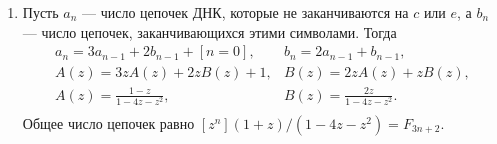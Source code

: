 \documentclass[14pt]{book}
\begin{document}
\begin{enumerate}
\item Пусть $a_n$ --- число цепочек ДНК, которые не заканчиваются на $c$ или $e$, а $b_n$ --- число
      цепочек, заканчивающихся этими символами. Тогда
      $$
      \begin{array}{ll}
      a_n = 3a_{n-1}+2b_{n-1}+[n=0], & b_n = 2a_{n-1} + b_{n-1}, \\
      A(z) = 3zA(z) + 2zB(z) + 1,    & B(z) = 2zA(z) + zB(z), \\
      A(z) = \frac{1-z}{1-4z-z^2},   & B(z) = \frac{2z}{1-4z-z^2}. \\
      \end{array}
      $$
      Общее число цепочек равно $[z^n](1+z)/(1-4z-z^2) = F_{3n+2}$.

\end{enumerate}
\end{document}
